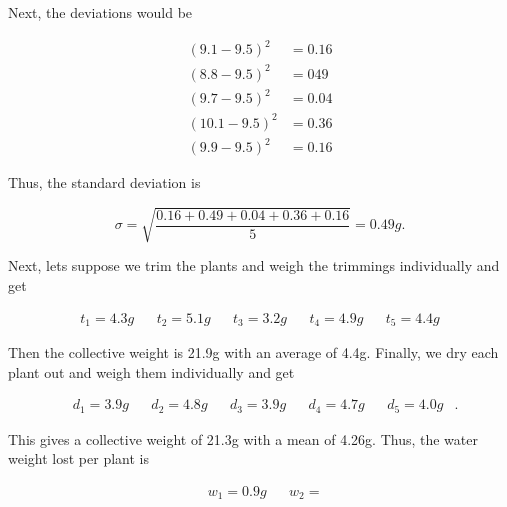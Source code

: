 \documentclass{article}
\theoremstyle{definition}
\theoremstyle{remark}
\theoremstyle{definition}
\begin{document}
\noindent Next, the deviations would be

\begin{equation*}
    \begin{split}
        (9.1-9.5)^2&=0.16 \\
        (8.8-9.5)^2&=049\\
        (9.7-9.5)^2&=0.04\\
        (10.1-9.5)^2&=0.36\\
        (9.9-9.5)^2&=0.16
    \end{split}
\end{equation*}

\noindent Thus, the standard deviation is 

\begin{equation*}
    \sigma=\sqrt{\frac{0.16+0.49+0.04+0.36+0.16}{5}}=0.49 g.
\end{equation*}

\noindent Next, lets suppose we trim the plants and weigh the trimmings  individually and get

\begin{align*}
    &t_1=4.3g& &t_2=5.1g& &t_3=3.2g& &t_4=4.9g& &t_5=4.4g&
\end{align*}

\noindent Then the collective weight is 21.9g with an average of 4.4g. Finally, we dry each plant out and weigh them individually and get 

\begin{align*}
    &d_1=3.9g& &d_2=4.8g& &d_3=3.9g& &d_4=4.7g& &d_5=4.0g&.
\end{align*}

\noindent This gives a collective weight of 21.3g with a mean of 4.26g. Thus, the water weight lost per plant is 

\begin{align*}
    &w_1=0.9g& &w_2=
\end{align*}
\end{document}
